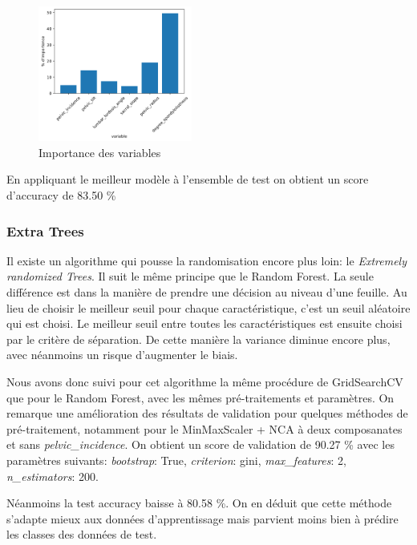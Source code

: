 \documentclass[twocolumn,10pt]{article}
\begin{document}
\begin{figure}[htbp]
    \begin{center}
        \includegraphics[width=0.45\textwidth]{figures/random_forest_features_importance.png}
        \caption{\label{fig:random_forest_features_importance}Importance des variables}
    \end{center}
\end{figure}

En appliquant le meilleur modèle à l'ensemble de test on obtient un score d'accuracy de 83.50 \%

\subsubsection{Extra Trees}
Il existe un algorithme qui pousse la randomisation encore plus loin: le \textit{Extremely randomized Trees}.
Il suit le même principe que le Random Forest. La seule différence est dans la manière de prendre une décision au niveau d'une feuille. Au lieu de choisir le meilleur seuil pour chaque caractéristique, c'est un seuil aléatoire qui est choisi.
Le meilleur seuil entre toutes les caractéristiques est ensuite choisi par le critère de séparation.
De cette manière la variance diminue encore plus, avec néanmoins un risque d'augmenter le biais\cite{scikit-learn-Extremely-Randomized-Trees}.

Nous avons donc suivi pour cet algorithme la même procédure de GridSearchCV que pour le Random Forest, avec les mêmes pré-traitements et paramètres.
On remarque une amélioration des résultats de validation pour quelques méthodes de pré-traitement, notamment pour le MinMaxScaler + NCA à deux composanates et sans \textit{pelvic\_incidence}.
On obtient un score de validation de 90.27 \% avec les paramètres suivants: \textit{bootstrap}: True,	\textit{criterion}: gini, \textit{max\_features}: 2,	\textit{n\_estimators}: 200.

Néanmoins la test accuracy baisse à 80.58 \%. On en déduit que cette méthode s'adapte mieux aux données d'apprentissage mais parvient moins bien à prédire les classes des données de test.
\end{document}
